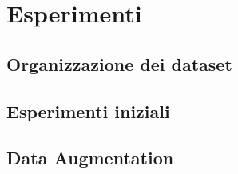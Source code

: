 \chapter{Esperimenti}
\label{chap:esperimenti}
\section{Organizzazione dei dataset}
\label{sec:dataset_org}
\section{Esperimenti iniziali}
\label{sec:esperimenti_iniziali}
\section{Data Augmentation}
\label{sec:data_augmentaion_experiment}